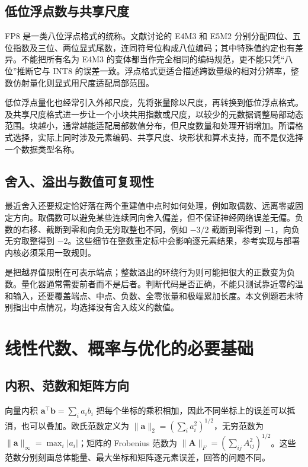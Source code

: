 \documentclass[UTF8,12pt,a4paper,fontset=fandol]{ctexart}
\begin{document}
\subsection{低位浮点数与共享尺度}
FP8 是一类八位浮点格式的统称。文献\cite{micikevicius2022}讨论的 E4M3 和 E5M2 分别分配四位、五位指数及三位、两位显式尾数，连同符号位构成八位编码；其中特殊值约定也有差异。不能把所有名为 E4M3 的变体都当作完全相同的编码规范，更不能只凭“八位”推断它与 INT8 的误差一致。浮点格式更适合描述跨数量级的相对分辨率，整数仿射量化则显式用尺度适配局部范围。

低位浮点量化也经常引入外部尺度，先将张量除以尺度，再转换到低位浮点格式。及共享尺度格式进一步让一个小块共用指数或尺度，以较少的元数据调整局部动态范围。块越小，通常越能适配局部数值分布，但尺度数量和处理开销增加。所谓格式选择，实际上同时涉及元素编码、共享尺度、块形状和算术支持，而不是仅选择一个数据类型名称。

\subsection{舍入、溢出与数值可复现性}
最近舍入还要规定恰好落在两个重建值中点时如何处理，例如取偶数、远离零或固定方向。取偶数可以避免某些连续同向舍入偏差，但不保证神经网络误差无偏。负数的右移、截断到零和向负无穷取整也不同，例如 $-3/2$ 截断到零得到 $-1$，向负无穷取整得到 $-2$。这些细节在整数重定标中会影响逐元素结果，参考实现与部署内核必须采用一致规则。

是把越界值限制在可表示端点；整数溢出的环绕行为则可能把很大的正数变为负数。量化器通常需要前者而不是后者。判断代码是否正确，不能只测试靠近零的温和输入，还要覆盖端点、中点、负数、全零张量和极端累加长度。本文例题若未特别指出中点情况，均选择没有舍入歧义的数值。

\section{线性代数、概率与优化的必要基础}
\label{sec:quant-math}

\subsection{内积、范数和矩阵方向}
向量内积 $\mathbf a^\top\mathbf b=\sum_i a_i b_i$ 把每个坐标的乘积相加，因此不同坐标上的误差可以抵消，也可以叠加。欧氏范数定义为 $\|\mathbf a\|_2=(\sum_i a_i^2)^{1/2}$，无穷范数为 $\|\mathbf a\|_\infty=\max_i|a_i|$；矩阵的 Frobenius 范数为 $\|\mathbf A\|_F=(\sum_{ij}A_{ij}^2)^{1/2}$。这些范数分别刻画总体能量、最大坐标和矩阵逐元素误差，回答的问题不同。
\end{document}
